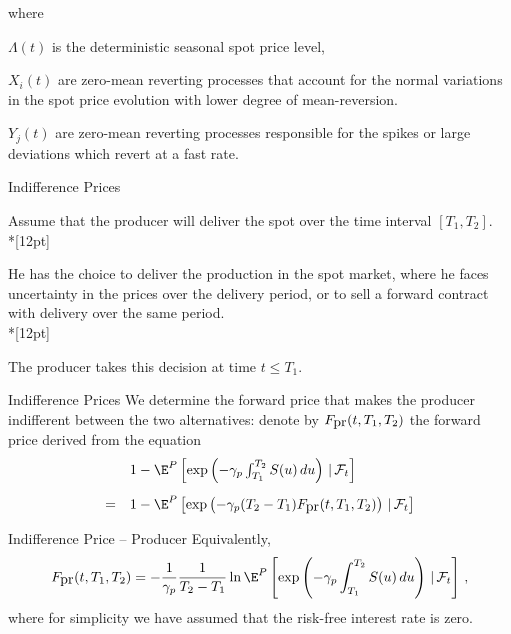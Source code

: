 where






	$\Lambda(t)$ is the deterministic seasonal spot price level,

	$X_i(t)$ are zero-mean reverting processes that account for the normal
variations in the spot price evolution with lower degree of
mean-reversion.

	$Y_j(t)$ are
zero-mean reverting processes responsible for the spikes or large
deviations which revert at a fast rate.











{Indifference Prices}

Assume that the producer will deliver the spot over the time
interval $[T_1,T_2]$.\\*[12pt]

He has the choice to deliver the production in
the spot market, where he faces uncertainty in the prices over the
delivery period, or to sell a forward contract with delivery over
the same period.\\*[12pt]

The producer takes this decision at time $t\leq
T_1$.

{Indifference Prices}
We determine the forward price that makes the producer indifferent
between the two alternatives: denote by $F_{\hbox{pr}}(t,T_1,T_2)$
the forward price derived from the equation
$$
\begin{array}{ll}

& 1-\E^P\left[\exp\left(-\gamma_p\int_{T_1}^{T_2}S(u)\,du\right)\,|\,
\mathcal{F}_t\right]\\*[12pt]
= & 1-\E^P\left[\exp\left(-\gamma_p(T_2-T_1)F_{\hbox{pr}}(t,T_1,T_2)\right)\,|\,
\mathcal{F}_t\right]
\end{array}
$$

{Indifference Price -- Producer}
Equivalently,
\begin{equation}
\label{def-producer}
F_{\hbox{pr}}(t,T_1,T_2)=-\frac1{\gamma_p}\frac1{T_2-T_1}\ln\E^P
\left[\exp\left(-\gamma_p\int_{T_1}^{T_2}S(u)\,du\right)\,|\,
\mathcal{F}_t\right]\,,
\end{equation}
where for simplicity we have assumed that the risk-free interest
rate is zero.

